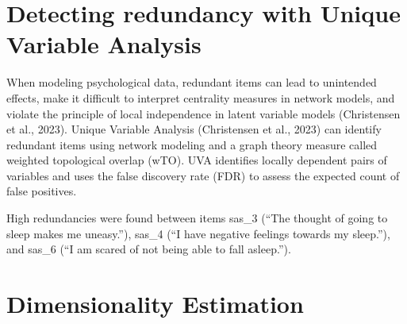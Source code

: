 \documentclass[
  letterpaper,
  DIV=11,
  numbers=noendperiod]{scrreprt}
\newenvironment{Shaded}{\begin{snugshade}}{\end{snugshade}}
\newcommand{\AttributeTok}[1]{\textcolor[rgb]{0.40,0.45,0.13}{#1}}
\newcommand{\ConstantTok}[1]{\textcolor[rgb]{0.56,0.35,0.01}{#1}}
\newcommand{\DecValTok}[1]{\textcolor[rgb]{0.68,0.00,0.00}{#1}}
\newcommand{\FunctionTok}[1]{\textcolor[rgb]{0.28,0.35,0.67}{#1}}
\newcommand{\NormalTok}[1]{\textcolor[rgb]{0.00,0.23,0.31}{#1}}
\newcommand{\OtherTok}[1]{\textcolor[rgb]{0.00,0.23,0.31}{#1}}
\newcommand{\SpecialCharTok}[1]{\textcolor[rgb]{0.37,0.37,0.37}{#1}}
\newcommand{\StringTok}[1]{\textcolor[rgb]{0.13,0.47,0.30}{#1}}
\begin{document}
\hypertarget{detecting-redundancy-with-unique-variable-analysis}{%
\section{Detecting redundancy with Unique Variable
Analysis}\label{detecting-redundancy-with-unique-variable-analysis}}

When modeling psychological data, redundant items can lead to unintended
effects, make it difficult to interpret centrality measures in network
models, and violate the principle of local independence in latent
variable models (Christensen et al., 2023). Unique Variable Analysis
(Christensen et al., 2023) can identify redundant items using network
modeling and a graph theory measure called weighted topological overlap
(wTO). UVA identifies locally dependent pairs of variables and uses the
false discovery rate (FDR) to assess the expected count of false
positives.

\begin{Shaded}
\end{Shaded}

High redundancies were found between items sas\_3 (``The thought of
going to sleep makes me uneasy.''), sas\_4 (``I have negative feelings
towards my sleep.''), and sas\_6 (``I am scared of not being able to
fall asleep.'').

\hypertarget{dimensionality-estimation}{%
\section{Dimensionality Estimation}\label{dimensionality-estimation}}
\end{document}
